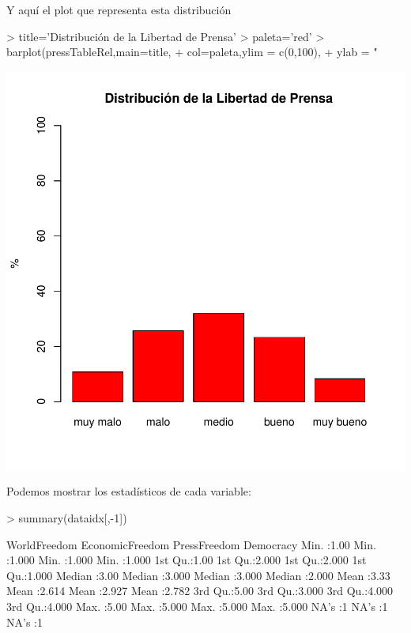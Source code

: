 \documentclass{article}
\begin{document}
Y aquí el plot que representa esta distribución
\begin{Schunk}
\begin{Sinput}
> title='Distribución de la Libertad de Prensa'
> paleta='red'
> barplot(pressTableRel,main=title,
+         col=paleta,ylim = c(0,100),
+         ylab = "%
\end{Sinput}
\end{Schunk}
\includegraphics{paperVersion_0-pressTableRelPlot}


Podemos mostrar los estadísticos de cada variable:
\begin{Schunk}
\begin{Sinput}
> summary(dataidx[,-1])
\end{Sinput}
\begin{Soutput}
  WorldFreedom  EconomicFreedom  PressFreedom     Democracy    
 Min.   :1.00   Min.   :1.000   Min.   :1.000   Min.   :1.000  
 1st Qu.:1.00   1st Qu.:2.000   1st Qu.:2.000   1st Qu.:1.000  
 Median :3.00   Median :3.000   Median :3.000   Median :2.000  
 Mean   :3.33   Mean   :2.614   Mean   :2.927   Mean   :2.782  
 3rd Qu.:5.00   3rd Qu.:3.000   3rd Qu.:4.000   3rd Qu.:4.000  
 Max.   :5.00   Max.   :5.000   Max.   :5.000   Max.   :5.000  
 NA's   :1                      NA's   :1       NA's   :1      
\end{Soutput}
\end{Schunk}
\end{document}

